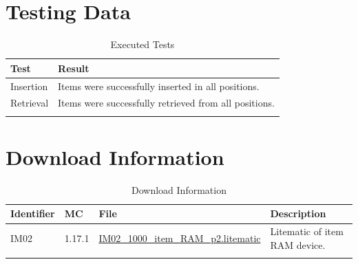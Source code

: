 \documentclass[10pt]{datasheet}
\begin{document}
\section{Testing Data}

\begin{table}[h]
\caption{Executed Tests}
\begin{tabularx}{\textwidth}{l | X}
    \thickhline
    \textbf{Test} & \textbf{Result} \\
    \hline
    Insertion & Items were successfully inserted in all positions. \\
    \hline
    Retrieval & Items were successfully retrieved from all positions. \\
    \thickhline
\end{tabularx}
\end{table}

\section{Download Information}
\begin{table}[h]
    \caption{Download Information}
    \begin{tabularx}{\textwidth}{l | l | l | X}
        \thickhline
        \textbf{Identifier} & \textbf{MC} & \textbf{File} & \textbf{Description} \\
        \hline
        IM02 & 1.17.1 & \href{https://github.com/Soontech-Annals/Archive/blob/8413f90a054b6c415703bae02badeba7541344f6/Archive/item-memory/IM02\%201000\%20Item\%20RAM/IM02\_1000\_item\_RAM\_p2.litematic?raw=1}{IM02\_1000\_item\_RAM\_p2.litematic} & Litematic of item RAM device. \\
        \thickhline
    \end{tabularx}
\end{table}
\end{document}
